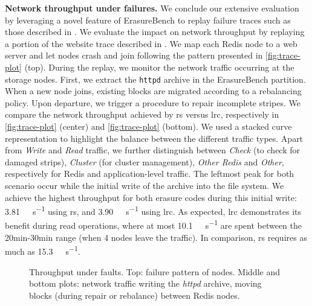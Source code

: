 \textbf{Network throughput under failures.}
\label{subsec:fault-trace}
We conclude our extensive evaluation by leveraging a novel feature of ErasureBench to replay failure traces such as those described in \autocite{fta-journal}.
We evaluate the impact on network throughput by replaying a portion of the website trace described in \autocite{websites02}.
We map each Redis node to a web server and let nodes crash and join following the pattern presented in \autoref{fig:trace-plot} (top).
During the replay, we monitor the network traffic occurring at the storage nodes.
First, we extract the \texttt{httpd} archive in the ErasureBench partition.
When a new node joins, existing blocks are migrated according to a rebalancing policy.
Upon departure, we trigger a procedure to repair incomplete stripes.
We compare the network throughput achieved by \ac{rs} versus \ac{lrc}, respectively in \autoref{fig:trace-plot} (center) and \autoref{fig:trace-plot} (bottom).
We used a stacked curve representation to highlight the balance between the different traffic types. 
Apart from \textit{Write} and \textit{Read} traffic, we further distinguish between \textit{Check} (to check for damaged strips), \textit{Cluster} (for cluster management), \textit{Other Redis} and \textit{Other}, respectively for Redis and application-level traffic.
The leftmost peak for both scenario occur while the initial write of the archive into the file system.
We achieve the highest throughput for both erasure codes during this initial write: \SI{3.81}{\mega\byte\per\second} using \ac{rs}, and \SI{3.90}{\mega\byte\per\second} using \ac{lrc}.
As expected, \ac{lrc} demonstrates its benefit during read operations, where at most \SI{10.1}{\mega\byte\per\second} are spent between the 20min-30min range (when 4 nodes leave the traffic). 
In comparison, \ac{rs} requires as much as \SI{15.3}{\mega\byte\per\second}.
\begin{figure}[ht]
    \centering
    
    \caption{Throughput under faults. Top: failure pattern of nodes. Middle and bottom plots: network traffic writing the \textit{httpd} archive, moving blocks (during repair or rebalance) between Redis nodes.}
    \label{fig:trace-plot}
\end{figure}
